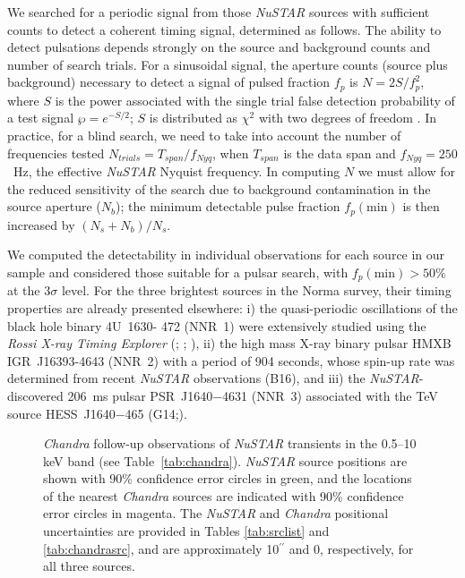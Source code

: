 \documentclass[iop,revtex4]{emulateapj}
\begin{document}
We searched for a periodic signal from those \textit{NuSTAR} sources with
sufficient counts to detect a coherent timing signal, determined as
follows. The ability to detect pulsations depends strongly on the
source and background counts and number of search trials.  For a
sinusoidal signal, the aperture counts (source plus
background) necessary to detect a signal of pulsed fraction $f_p$ is
$N=2S/f^2_p$, where $S$ is the power associated with the single trial false
detection probability of a test signal $\wp = e^{-S/2}$; $S$ is
distributed as $\chi^2$ with two degrees of freedom \citep{vanderklis89}.  In practice, for
a blind search, we need to take into account the number of frequencies
tested $N_{trials} = T_{span}/f_{Nyq}$, when $T_{span}$ is the data
span and $f_{Nyq} = 250$~Hz, the effective \textit{NuSTAR} Nyquist
frequency. In computing $N$ we must allow for the reduced
sensitivity of the search due to background contamination in the
source aperture ($N_b$); the minimum detectable pulse fraction
$f_p({\mathrm{min}})$ is then increased by $(N_s+N_b)/N_s$.\par
We computed the detectability in individual observations for each source in our sample and considered those suitable for a pulsar
search, with $f_p({\mathrm{min}}) > 50\%$ at the $3\sigma$ level.  For the
three brightest sources in the Norma survey, their timing properties
are already presented elsewhere: i) the quasi-periodic oscillations of
the black hole binary 4U~1630- 472 (NNR~1) were extensively studied
using the \textit{Rossi X-ray Timing Explorer} (\citealt{tomsick00}; \citealt{dieters00}; \citealt{seifina14}), ii) the high mass X-ray binary pulsar HMXB IGR~J16393-4643 (NNR~2) with a period of 904 seconds, whose spin-up rate
was determined from recent \textit{NuSTAR} observations (B16),
and iii) the \textit{NuSTAR}-discovered 206~ms pulsar PSR~J1640$-$4631 (NNR~3)
associated with the TeV source HESS~J1640$-$465 (G14;\citealt{archibald16}).\par

\begin{figure*}[t]
	\centering
	\caption{\textit{Chandra} follow-up observations of \textit{NuSTAR} transients in the 0.5--10 keV band (see Table~\ref{tab:chandra}).  \textit{NuSTAR} source positions are shown with 90\% confidence error circles in green, and the locations of the nearest \textit{Chandra} sources are indicated with 90\% confidence error circles in magenta.  The \textit{NuSTAR} and \textit{Chandra} positional uncertainties are provided in Tables \ref{tab:srclist} and \ref{tab:chandrasrc}, and are approximately 10$^{\prime\prime}$ and 0, respectively, for all three sources. }
\label{fig:chandrapos}
\end{figure*}
\end{document}
